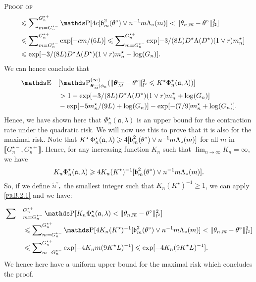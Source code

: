 \begin{pro}{\textsc{Proof of } \\}
\begin{alignat*}{2}
& && \leq \sum\nolimits_{m = G_{n}^{\star-}}^{G_{n}^{\star+}} \P[ 4c [\b_{m}^{2}(\theta^{\circ}) \vee n^{-1} m \Lambda_{\circ}(m)] < \Vert \theta_{n, \overline{m}} - \theta^{\circ} \Vert_{l^{2}}^{2}]\\
& && \leq \sum\nolimits_{m = G_{n}^{\star-}}^{G_{n}^{\star+}} \exp[- c m / (6 L) ] \leq \sum\nolimits_{m = G_{n}^{\star-}}^{G_{n}^{\star+}} \exp[- 3/(8 L) D^{\star} \Lambda(D^{\star}) (1 \vee r) m_{n}^{\star}] \\
& && \leq \exp[-3/(8 L) D^{\star} \Lambda(D^{\star}) (1 \vee r ) m_{n}^{\star} + \log(G_{n})].
\end{alignat*}
We can hence conclude that
\begin{alignat*}{2}
& \E&&[\P_{\boldsymbol{\theta}_{\overline{M}}\vert \phi_{n}}^{(\infty)}(\Vert \boldsymbol{\theta}_{\overline{M}} - \theta^{\circ} \Vert_{l^{2}}^{2} \leq K^{\star} \Phi_{n}^{\star}(\mathfrak{a}, \lambda))]\\
& && > 1 - \exp[-3/(8 L) D^{\star} \Lambda(D^{\star}) (1 \vee r) m_{n}^{\star} + \log(G_{n})]\\
& &&- \exp[- 5 m_{n}^{\star} / (9 L) + \log(G_{n})] - \exp[- (7/9) m_{n}^{\star} + \log(G_{n})].
\end{alignat*}
Hence, we have shown here that $\Phi_{n}^{\star}(\mathfrak{a}, \lambda)$ is an upper bound for the contraction rate under the quadratic risk.
We will now use this to prove that it is also for the maximal risk.
Note that $K^{\star} \, \Phi_{n}^{\star}(\mathfrak{a}, \lambda) \geqslant 4 [\operatorname{\mathfrak{b}}_{m}^{2}(\theta^{\circ}) \vee n^{-1} m \Lambda_{\circ}(m)]$ for all $m$ in $\llbracket G_{n}^{\star-}, G_{n}^{\star+} \rrbracket$.
Hence, for any increasing function $K_{n}$ such that $\lim\nolimits_{n \rightarrow \infty} K_{n} = \infty,$ we have
\[K_{n} \Phi_{n}^{\star}(\mathfrak{a}, \lambda) \geqslant 4 K_{n} (K^{\star})^{-1} [\operatorname{\mathfrak{b}}_{m}^{2}(\theta^{\circ}) \vee n^{-1} m \Lambda_{\circ}(m) ].\]
So, if we define $\tilde{n}^{\circ},$ the smallest integer such that $K_{n}(K^{\star})^{-1} \geq 1$, we can apply \textsc{\cref{prB.2.1}} and we have:

\begin{alignat*}{2}
& \sum\nolimits&&_{m = G_{n}^{\star -}}^{G_{n}^{\star +}} \P[K_{n} \Phi_{n}^{\star}(\mathfrak{a}, \lambda) < \Vert \theta_{n, \overline{m}} - \theta^{\circ} \Vert_{l^{2}}^{2}]\\
& && \leq \sum\nolimits_{m = G_{n}^{\star-}}^{G_{n}^{\star+}} \P[4 K_{n}(K^{\star})^{-1} [\b_{m}^{2}(\theta^{\circ}) \vee n^{-1}m \Lambda_{\circ}(m) ] < \Vert \theta_{n, \overline{m}} - \theta^{\circ} \Vert_{l^{2}}^{2}] \\
& && \leq \sum\nolimits_{m = G_{n}^{\star-}}^{G_{n}^{\star+}} \exp[-4 K_{n} m(9 K^{\star} L)^{-1}] \leq \exp[-4 K_{n}(9 K^{\star} L)^{-1}].
\end{alignat*}
We hence here have a uniform upper bound for the maximal risk which concludes the proof.
\proEnd
\end{pro}


